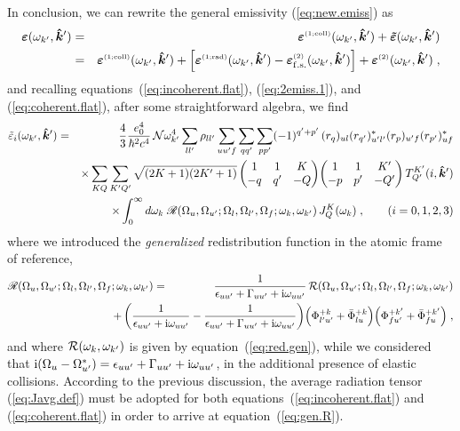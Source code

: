 \documentclass[preprint]{aastex}
\newcommand{\<}{{\kern-5pt}}
\newcommand{\thrj}[6]{\biggl(
	\begin{matrix}
	#1&#2&#3\\
	#4&#5&#6\\
	\end{matrix}\biggr)}
\newcommand{\apx}[1]{^{\mbox{\tiny{(#1)}}}}
\begin{document}
In conclusion, we can rewrite the general emissivity (\ref{eq:new.emiss}) as
%
\begin{eqnarray} \label{eq:new.emiss.1}
\bm{\varepsilon}(\omega_{k'},\bm{\hat k}')
&=&
\bm{\varepsilon}\apx{1;coll}(\omega_{k'},\bm{\hat k}')+
\bm{\tilde\varepsilon}(\omega_{k'},\bm{\hat k}') \nonumber \\
&=&
\bm{\varepsilon}\apx{1;coll}(\omega_{k'},\bm{\hat k}')+
\left[\bm{\varepsilon}\apx{1;rad}(\omega_{k'},\bm{\hat k}')-
\bm{\varepsilon}\apx{2}_{\rm f.s.}(\omega_{k'},\bm{\hat k}')\right]
+\bm{\varepsilon}\apx{2}(\omega_{k'},\bm{\hat k}')\;,
\end{eqnarray}
%
%
and recalling equations~(\ref{eq:incoherent.flat}),
(\ref{eq:2emiss.1}), and (\ref{eq:coherent.flat}), after some
straightforward algebra, we find
%
\begin{eqnarray} \label{eq:tilde.emiss}
\tilde\varepsilon_i(\omega_{k'},\bm{\hat k}')
&=&\frac{4}{3}\frac{e_0^4}{\hbar^2 c^4}\,{\cal N}\omega_{k'}^4
	\sum_{ll'}\rho_{ll'}\sum_{uu'f}
	\sum_{qq'}\sum_{pp'}(-1)^{q'+p'}\,
	(r_q)_{ul}(r_{q'})^\ast_{u'l'}
	(r_p)_{u'f}(r_{p'})^\ast_{uf} \nonumber \\
&&\times
	\sum_{KQ}\sum_{K'Q'}\sqrt{(2K+1)(2K'+1)}\,
	\thrj{1}{1}{K}{-q}{q'}{-Q}
	\thrj{1}{1}{K'}{-p}{p'}{-Q'}\,
	T^{K'}_{Q'}(i,\bm{\hat k}') \nonumber \\
&&\times \int_0^\infty d\omega_k\;
	\mathscr{R}(\Omega_u,\Omega_{u'};
	\Omega_l,\Omega_{l'},\Omega_{f};
	\omega_k,\omega_{k'})\,
	J^K_Q(\omega_k)\;,\qquad (i=0,1,2,3)
\end{eqnarray}
%
where we introduced the \emph{generalized} 
redistribution function in the atomic frame of reference,
%
\begin{eqnarray} \label{eq:gen.R}
{\mathscr{R}}(\Omega_u,\Omega_{u'};
	\Omega_l,\Omega_{l'},\Omega_{f};
	\omega_k,\omega_{k'})
&=& \frac{1}{\epsilon_{uu'}+\Gamma_{uu'}+{\rm i}\omega_{uu'}}\,
{\cal R}(\Omega_u,\Omega_{u'};
	\Omega_l,\Omega_{l'},\Omega_{f};
	\omega_k,\omega_{k'}) \\
&&\kern -2cm + \left( \frac{1}{\epsilon_{uu'}+{\rm i}\omega_{uu'}}
         - \frac{1}{\epsilon_{uu'}+\Gamma_{uu'}+{\rm i}\omega_{uu'}}
           \right)\!
	\Bigl(
	\Phi_{l'u'}^{+k} + \bar\Phi_{lu}^{+k}
	\Bigr)
	\Bigl(
	\Phi_{fu'}^{+k'} + \bar\Phi_{fu}^{+k'}
	\Bigr)\;, \nonumber
\end{eqnarray}
%
and where ${\cal R}(\omega_k,\omega_{k'})$ is given by 
equation~(\ref{eq:red.gen}), while we considered that 
${\rm i}(\Omega_u-\Omega_{u'}^\ast)
=\epsilon_{uu'}+\Gamma_{uu'}+{\rm i}\omega_{uu'}$, in the additional 
presence of elastic collisions. According to the previous discussion, the 
average radiation tensor (\ref{eq:Javg.def}) must be adopted for both 
equations~(\ref{eq:incoherent.flat}) and (\ref{eq:coherent.flat}) in
order to arrive at equation~(\ref{eq:gen.R}). 
\end{document}

